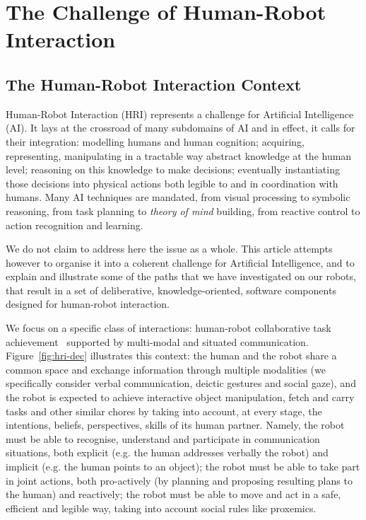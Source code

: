 \documentclass[preprint,3p,times]{elsarticle}
\newcommand{\eg}{e.g.\xspace}
\begin{document}

\section{The Challenge of Human-Robot Interaction}

\subsection{The Human-Robot Interaction Context}

Human-Robot Interaction (HRI) represents a challenge for Artificial Intelligence
(AI). It lays at the crossroad of many subdomains of AI and in effect, it calls
for their integration: modelling humans and human cognition; acquiring,
representing, manipulating in a tractable way abstract knowledge at the human
level; reasoning on this knowledge to make decisions; eventually instantiating
those decisions into physical actions both legible to and in coordination with
humans.  Many AI techniques are mandated, from visual processing to symbolic
reasoning, from task planning to \emph{theory of mind} building, from reactive
control to action recognition and learning.

We do not claim to address here the issue as a whole. This article attempts
however to organise it into a coherent challenge for Artificial Intelligence,
and to explain and illustrate some of the paths that we have investigated on our
robots, that result in a set of deliberative, knowledge-oriented, software
components designed for human-robot interaction.


We focus on a specific class of interactions: human-robot collaborative task
achievement~\cite{alami2013human} 
supported by multi-modal and situated communication. Figure~\ref{fig:hri-dec}
illustrates this context: the human and the robot share a common space and exchange
information through multiple modalities (we specifically consider verbal
communication, deictic gestures and social gaze), and the robot is expected to achieve
interactive object manipulation, fetch and carry tasks and other similar
chores by taking into account, at every stage, the intentions, beliefs,
perspectives, skills of its human partner.  Namely, the robot must be able to
recognise, understand and participate in communication situations, both explicit
(\eg the human addresses verbally the robot) and implicit (\eg the human points
to an object); the robot must be able to take part in joint actions, both
pro-actively (by planning and proposing resulting plans to the human) and
reactively; the robot must be able to move and act in a safe, efficient and
legible way, taking into account social rules like proxemics.
\end{document}
